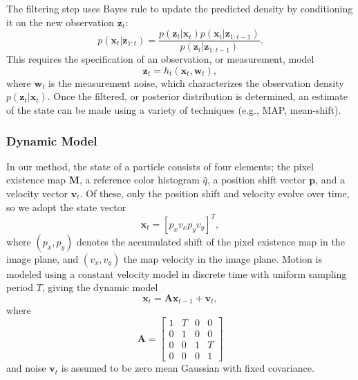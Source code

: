 The filtering step uses Bayes rule to update the predicted density by conditioning it on the new observation $\mathbf{z}_t$:
\begin{equation} \label{eqn:posterior}
\mathit{p}(\mathbf{x}_t|\mathbf{z}_{1:t}) =  \frac{ \mathit{p}(\mathbf{z}_t|\mathbf{x}_{t})\mathit{p}(\mathbf{x}_{t}|\mathbf{z}_{1:t-1})} {\mathit{p}(\mathbf{z}_{t}|\mathbf{z}_{1:t-1})}. 
\end{equation}
This requires the specification of an observation, or measurement, model
\begin{equation} 
\mathbf{z}_t = \mathit{h}_t(\mathbf{x}_{t},\mathbf{w}_t) ,
\end{equation}
where $\mathbf{w}_t$ is the measurement noise, which characterizes the observation density $\mathit{p}(\mathbf{z}_t|\mathbf{x}_{t})$. Once the filtered, or posterior distribution is determined, an estimate of the state can be made using a variety of techniques (e.g., MAP, mean-shift). 

\subsubsection{Dynamic Model}
In our method, the state of a particle consists of four elements; the pixel existence map $\mathbf{M}$, a reference color histogram $\hat{q}$, a position shift vector $\mathbf{p}$, and a velocity vector $\mathbf{v}_t$. Of these, only the position shift and velocity evolve over time, so we adopt the state vector
 \begin{equation} 
 \mathbf{x}_t = [p_x v_x p_y v_y]^T ,
 \end{equation}
where $(p_x,p_y)$ denotes the accumulated shift of the pixel existence map in the image plane, and $(v_x,v_y)$ the map velocity in the image plane. Motion is modeled using a constant velocity model in discrete time with uniform sampling period $\mathit{T}$, giving the dynamic model
\begin{equation} \mathbf{x}_t = \mathbf{A}\mathbf{x}_{t-1} + \mathbf{v}_t , \end{equation}
where
\begin{equation} \mathbf{A} = 
\begin{bmatrix}
 1 & \mathit{T} & 0  & 0 \\ 
 0 & 1 & 0 & 0\\ 
 0 & 0 & 1 & \mathit{T}\\ 
 0 & 0 & 0 & 1
\end{bmatrix} \end{equation}
and noise $\mathbf{v}_t$ is assumed to be zero mean Gaussian with fixed covariance.

